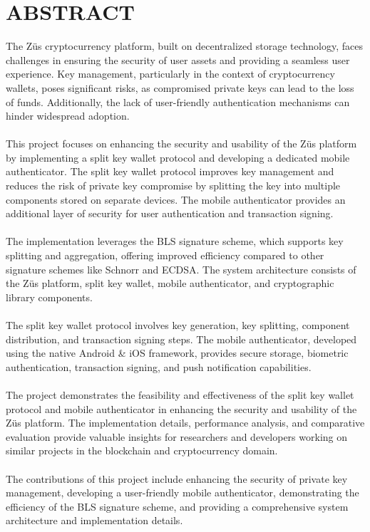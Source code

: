 \chapter*{ABSTRACT}
The Züs cryptocurrency platform, built on decentralized storage technology, faces challenges in ensuring the security of user assets and providing a seamless user experience. Key management, particularly in the context of cryptocurrency wallets, poses significant risks, as compromised private keys can lead to the loss of funds. Additionally, the lack of user-friendly authentication mechanisms can hinder widespread adoption. \\ \\
This project focuses on enhancing the security and usability of the Züs platform by implementing a split key wallet protocol and developing a dedicated mobile authenticator. The split key wallet protocol improves key management and reduces the risk of private key compromise by splitting the key into multiple components stored on separate devices. The mobile authenticator provides an additional layer of security for user authentication and transaction signing. \\ \\
The implementation leverages the BLS signature scheme, which supports key splitting and aggregation, offering improved efficiency compared to other signature schemes like Schnorr and ECDSA. The system architecture consists of the Züs platform, split key wallet, mobile authenticator, and cryptographic library components. \\ \\
The split key wallet protocol involves key generation, key splitting, component distribution, and transaction signing steps. The mobile authenticator, developed using the native Android & iOS framework, provides secure storage, biometric authentication, transaction signing, and push notification capabilities. \\ \\
The project demonstrates the feasibility and effectiveness of the split key wallet protocol and mobile authenticator in enhancing the security and usability of the Züs platform. The implementation details, performance analysis, and comparative evaluation provide valuable insights for researchers and developers working on similar projects in the blockchain and cryptocurrency domain. \\ \\
The contributions of this project include enhancing the security of private key management, developing a user-friendly mobile authenticator, demonstrating the efficiency of the BLS signature scheme, and providing a comprehensive system architecture and implementation details. \\ \\

